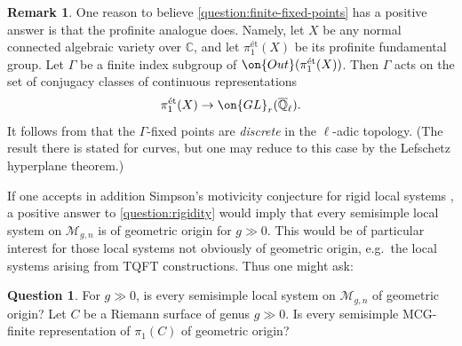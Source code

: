 \documentclass[12 pt]{amsart}
\theoremstyle{plain}
\theoremstyle{definition}
\newtheorem{remark}[subsubsection]{Remark}
\newtheorem{question}[subsubsection]{Question}
\theoremstyle{remark}
\numberwithin{equation}{section}
\begin{document}
\begin{remark}
One reason to believe \autoref{question:finite-fixed-points} has a positive answer is that the profinite analogue does. Namely, let $X$ be any normal connected algebraic variety over $\mathbb{C}$, and let $\pi_1^{\text{\'et}}(X)$ be its profinite fundamental group. Let $\Gamma$ be a finite index subgroup of $\on{Out}(\pi_1^{\text{\'et}}(X))$. Then $\Gamma$ acts on the set of conjugacy classes of continuous representations $$\pi_1^{\text{\'et}}(X)\to \on{GL}_r(\overline{\mathbb{Q}}_\ell).$$ It follows from \cite[Remark 1.1.4]{litt2021arithmetic} that the $\Gamma$-fixed points are \emph{discrete} in the $\ell$-adic topology. (The result there is stated for curves, but one may reduce to this case by the Lefschetz hyperplane theorem.)
\end{remark}



If one accepts in addition Simpson's motivicity conjecture for rigid local systems \cite[Conjecture on p.~9]{simpson1992higgs}, a positive answer to \autoref{question:rigidity} would imply that every semisimple local system on $\mathscr{M}_{g,n}$ is of geometric origin for $g\gg 0$. This would be of particular interest for those local systems not obviously of geometric origin, e.g.~the local systems arising from TQFT constructions. 
Thus one might ask:

\begin{question}
For $g\gg 0$, is every semisimple local system on $\mathscr{M}_{g,n}$ of geometric origin? Let $C$ be a Riemann surface of genus $g\gg 0$. Is every semisimple MCG-finite representation of $\pi_1(C)$ of geometric origin?
\end{question}
\end{document}
